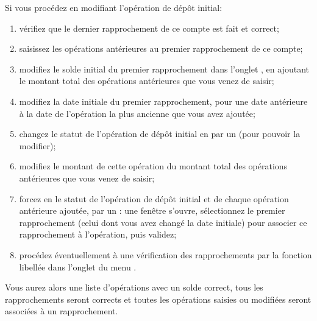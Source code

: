 Si vous procédez en modifiant l'opération de dépôt initial:
\begin{enumerate}
	\item vérifiez que le dernier rapprochement de ce compte est fait et correct;
	\item saisissez les opérations antérieures au premier rapprochement de ce compte;
	\item modifiez le solde initial du premier rapprochement dans l'onglet , en ajoutant le montant total des opérations antérieures que vous venez de saisir;
	\item modifiez la date initiale du premier rapprochement, pour une date antérieure à la date de l'opération la plus ancienne que vous avez ajoutée;
	\item changez le statut de l'opération de dépôt initial en  par un  (pour pouvoir la modifier);
	\item modifiez le montant de cette opération du montant total des opérations antérieures que vous venez de saisir;
	\item forcez en  le statut de l'opération de dépôt initial et de chaque opération antérieure ajoutée, par un : une fenêtre s'ouvre, sélectionnez le premier rapprochement (celui dont vous avez changé la date initiale) pour associer ce rapprochement à l'opération, puis validez;
	\item procédez éventuellement à une vérification des rapprochements par la fonction libellée  dans l'onglet  du menu .
\end{enumerate}

Vous aurez alors une liste d'opérations avec un solde correct, tous les rapprochements seront corrects et toutes les opérations saisies ou modifiées seront associées à un rapprochement.


